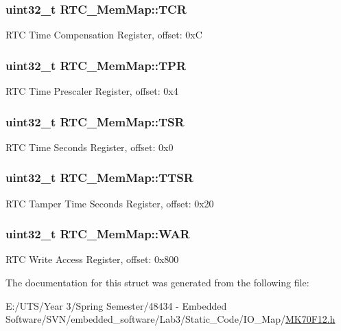 \subsubsection[{T\+C\+R}]{\setlength{\rightskip}{0pt plus 5cm}uint32\+\_\+t R\+T\+C\+\_\+\+Mem\+Map\+::\+T\+C\+R}\label{struct_r_t_c___mem_map_ab816b0540497796070202cd2f5bc10ed}
R\+T\+C Time Compensation Register, offset\+: 0x\+C \hypertarget{struct_r_t_c___mem_map_a32641b62d548255bdf2164b457a2aaeb}{}
\subsubsection[{T\+P\+R}]{\setlength{\rightskip}{0pt plus 5cm}uint32\+\_\+t R\+T\+C\+\_\+\+Mem\+Map\+::\+T\+P\+R}\label{struct_r_t_c___mem_map_a32641b62d548255bdf2164b457a2aaeb}
R\+T\+C Time Prescaler Register, offset\+: 0x4 \hypertarget{struct_r_t_c___mem_map_a4ca4d2878d99736cbff0e8b107a275f2}{}
\subsubsection[{T\+S\+R}]{\setlength{\rightskip}{0pt plus 5cm}uint32\+\_\+t R\+T\+C\+\_\+\+Mem\+Map\+::\+T\+S\+R}\label{struct_r_t_c___mem_map_a4ca4d2878d99736cbff0e8b107a275f2}
R\+T\+C Time Seconds Register, offset\+: 0x0 \hypertarget{struct_r_t_c___mem_map_a15cd6b1d2a7664e4280746a810d2583f}{}
\subsubsection[{T\+T\+S\+R}]{\setlength{\rightskip}{0pt plus 5cm}uint32\+\_\+t R\+T\+C\+\_\+\+Mem\+Map\+::\+T\+T\+S\+R}\label{struct_r_t_c___mem_map_a15cd6b1d2a7664e4280746a810d2583f}
R\+T\+C Tamper Time Seconds Register, offset\+: 0x20 \hypertarget{struct_r_t_c___mem_map_aa3d2abe1fdd440a05339c38d377a2ee6}{}
\subsubsection[{W\+A\+R}]{\setlength{\rightskip}{0pt plus 5cm}uint32\+\_\+t R\+T\+C\+\_\+\+Mem\+Map\+::\+W\+A\+R}\label{struct_r_t_c___mem_map_aa3d2abe1fdd440a05339c38d377a2ee6}
R\+T\+C Write Access Register, offset\+: 0x800 

The documentation for this struct was generated from the following file\+:\begin{DoxyCompactItemize}
\item 
E\+:/\+U\+T\+S/\+Year 3/\+Spring Semester/48434 -\/ Embedded Software/\+S\+V\+N/embedded\+\_\+software/\+Lab3/\+Static\+\_\+\+Code/\+I\+O\+\_\+\+Map/\hyperlink{_m_k70_f12_8h}{M\+K70\+F12.\+h}\end{DoxyCompactItemize}
